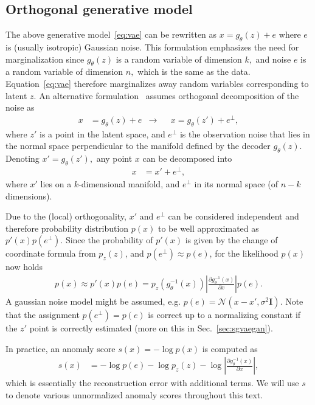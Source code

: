 \subsection{Orthogonal generative model} \label{sec:orthogonal_score}
The above generative model~\eqref{eq:vae} can be rewritten as $x=g_{\theta}(z)+e$ where $e$ is (usually isotropic) Gaussian noise. This formulation  emphasizes the need for marginalization since $g_{\theta}(z)$ is a random variable of dimension $k,$ and noise $e$ is a random variable of dimension $n,$ which is the same as the data. Equation~\eqref{eq:vae} therefore marginalizes away random variables corresponding to latent $z.$ An alternative formulation~\cite{pidhorskyi2018generative, vsmidl2019anomaly} assumes orthogonal decomposition of the noise as
\begin{align}
x&=g_{\theta}(z)+e & \rightarrow & &x=g_{\theta}(z')+e^{\bot},
\end{align}
where $z'$ is a point in the latent space, and $e^{\bot}$ is the observation noise that lies in the normal space perpendicular to the manifold defined by the decoder $g_{\theta}(z)$. Denoting $x'=g_{\theta}(z'),$ any point $x$ can be decomposed  into 
\begin{align*}
x & =x'+e^{\bot},
\end{align*}
where $x'$ lies on a $k$-dimensional manifold, and $e^{\bot}$ in its normal space (of $n-k$ dimensions). 

Due to the (local) orthogonality, $x'$ and $e^{\bot}$ can be considered independent and therefore probability distribution $p(x)$ to be well approximated as $p'(x)p(e^{\bot})$. Since the probability of $p'(x)$ is given by the change of coordinate formula from $p_{z}(z)$, and $p(e^{\bot})\approx p(e)$, for the likelihood $p(x)$ now holds
\begin{align}
p(x)\approx p'(x)p(e)=p_{z}(g_{\theta}^{-1}(x))\left\vert \frac{\partial g_{\theta}^{-1}(x)}{\partial x}\right\vert p(e).\label{eq:pxjacodeco}
\end{align}
A gaussian noise model might be assumed, e.g. $p(e) = \mathcal{N}(x-x',\sigma^{2}\mathbf{I})$. Note that the assignment $p(e^{\bot})=p(e)$ is correct up to a normalizing constant if the $z'$ point is correctly estimated (more on this in Sec.~\ref{sec:sgvaegan}).

In practice, an anomaly score $s(x) = - \log p(x)$ is computed as
\begin{align}
s(x) & = - \log p(e) -\log p_{z}(z)-\log\left\vert \frac{\partial g_{\theta}^{-1}(x)}{\partial x}\right\vert ,\label{eq:jacodeco}
\end{align}
which is essentially the reconstruction error with additional terms. We will use $s$ to denote various unnormalized anomaly scores throughout this text.

